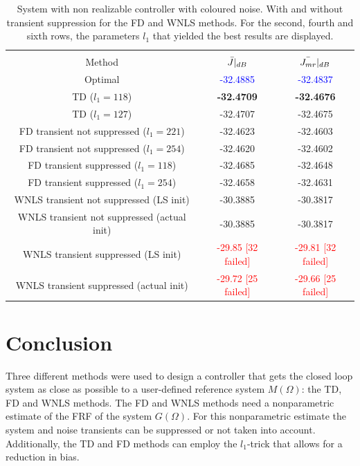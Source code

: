 \begin{table}[H]
\centering
\begin{tabular}{|ccc|}
\hline
&&\\[-2.5ex]
Method & $\Bar{J}|_{dB}$ & $\Bar{J_{mr}}|_{dB}$ \\
\hline
Optimal                                     & \textcolor{blue}{-32.4885} & \textcolor{blue}{-32.4837} \\
TD ($l_1 = 118$)                               & \textbf{-32.4709} & \textbf{-32.4676} \\
TD ($l_1 = 127$)                            & -32.4707 & -32.4675 \\
FD transient not suppressed ($l_1 = 221$)      & -32.4623 & -32.4603 \\
FD transient not suppressed ($l_1 = 254$)   & -32.4620 & -32.4602 \\
FD transient suppressed ($l_1 = 118$)          & -32.4685 & -32.4648 \\
FD transient suppressed ($l_1 = 254$)       & -32.4658 & -32.4631 \\
WNLS transient not suppressed (LS init)     & -30.3885 & -30.3817 \\
WNLS transient not suppressed (actual init) & -30.3885 & -30.3817 \\
WNLS transient suppressed (LS init)         & \textcolor{red}{-29.85 [32 failed]}      & \textcolor{red}{-29.81 [32 failed]}       \\
WNLS transient suppressed (actual init)     & \textcolor{red}{-29.72 [25 failed]}       & \textcolor{red}{-29.66 [25 failed]}       \\
\hline
\end{tabular}
\caption{System with non realizable controller with coloured noise. With and without transient suppression for the FD and WNLS methods. For the second, fourth and sixth rows, the parameters $l_1$ that yielded the best results are displayed.}
\label{tab:non_realizable_coloured_transient_with_without_TD_vs_FD_vs_WNLS}
\end{table}


\newpage
\section{Conclusion}
Three different methods were used to design a controller that gets the closed loop system as close as possible to a user-defined reference system $M(\Omega)$: the TD, FD and WNLS methods. The FD and WNLS methods need a nonparametric estimate of the FRF of the system $G(\Omega)$. For this nonparametric estimate the system and noise transients can be suppressed or not taken into account. Additionally, the TD and FD methods can employ the $l_1$-trick that allows for a reduction in bias.

